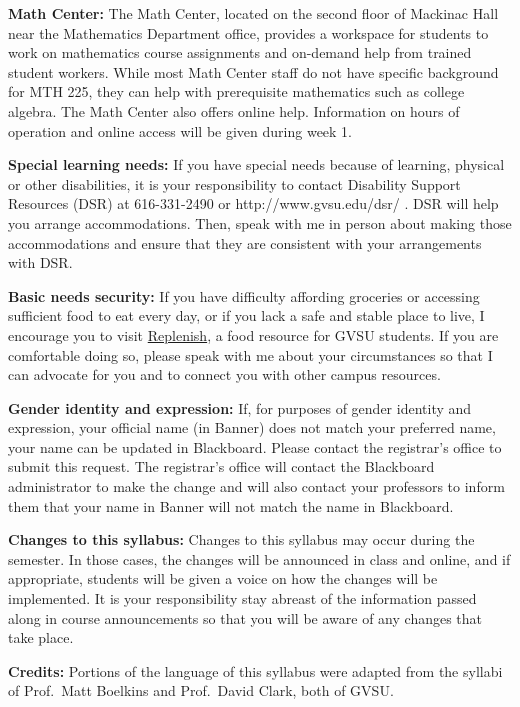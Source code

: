 \documentclass[]{article}
\begin{document}
\textbf{Math Center:} The Math Center, located on the second floor of
Mackinac Hall near the Mathematics Department office, provides a
workspace for students to work on mathematics course assignments and
on-demand help from trained student workers. While most Math Center
staff do not have specific background for MTH 225, they can help with
prerequisite mathematics such as college algebra. The Math Center also
offers online help. Information on hours of operation and online access
will be given during week 1.

\textbf{Special learning needs:} If you have special needs because of
learning, physical or other disabilities, it is your responsibility to
contact Disability Support Resources (DSR) at 616-331-2490 or
http://www.gvsu.edu/dsr/ . DSR will help you arrange accommodations.
Then, speak with me in person about making those accommodations and
ensure that they are consistent with your arrangements with DSR.

\textbf{Basic needs security:} If you have difficulty affording
groceries or accessing sufficient food to eat every day, or if you lack
a safe and stable place to live, I encourage you to visit
\href{https://www.gvsu.edu/replenish/}{Replenish}, a food resource for
GVSU students. If you are comfortable doing so, please speak with me
about your circumstances so that I can advocate for you and to connect
you with other campus resources.

\textbf{Gender identity and expression:} If, for purposes of gender
identity and expression, your official name (in Banner) does not match
your preferred name, your name can be updated in Blackboard. Please
contact the registrar's office to submit this request. The registrar's
office will contact the Blackboard administrator to make the change and
will also contact your professors to inform them that your name in
Banner will not match the name in Blackboard.

\textbf{Changes to this syllabus:} Changes to this syllabus may occur
during the semester. In those cases, the changes will be announced in
class and online, and if appropriate, students will be given a voice on
how the changes will be implemented. It is your responsibility stay
abreast of the information passed along in course announcements so that
you will be aware of any changes that take place.

\textbf{Credits:} Portions of the language of this syllabus were adapted
from the syllabi of Prof.~Matt Boelkins and Prof.~David Clark, both of
GVSU.
\end{document}
